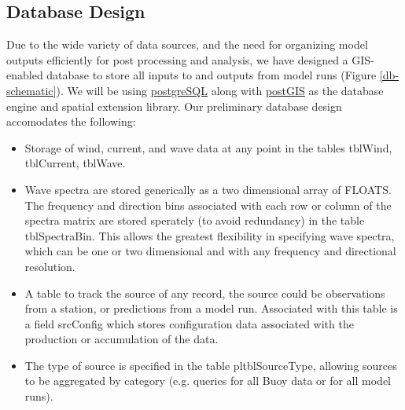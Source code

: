\documentclass[11pt,letterpaper,oneside,reqno]{article}
\begin{document}
\subsection{Database Design}

Due to the wide variety of data sources, and the need for
organizing model outputs efficiently for post processing and
analysis, we have designed a GIS-enabled database to store all
inputs to and outputs from model runs (Figure \ref{db-schematic}). We will be using
\href{http://www.postgresql.org/}{postgreSQL} along with
\href{http://postgis.refractions.net/}{postGIS} as the database
engine and spatial extension library. Our preliminary database
design accomodates the following:

\begin{itemize}
\item
  Storage of wind, current, and wave data at any point in the tables
  tblWind, tblCurrent, tblWave.
\item
  Wave spectra are stored generically as a two dimensional array of
  FLOATS. The frequency and direction bins associated with each row
  or column of the spectra matrix are stored sperately (to avoid
  redundancy) in the table tblSpectraBin. This allows the greatest
  flexibility in specifying wave spectra, which can be one or two
  dimensional and with any frequency and directional resolution.
\item
  A table to track the source of any record, the source could be
  observations from a station, or predictions from a model run.
  Associated with this table is a field srcConfig which stores
  configuration data associated with the production or accumulation
  of the data.
\item
  The type of source is specified in the table pltblSourceType,
  allowing sources to be aggregated by category (e.g. queries for all
  Buoy data or for all model runs).
\end{itemize}
\end{document}

